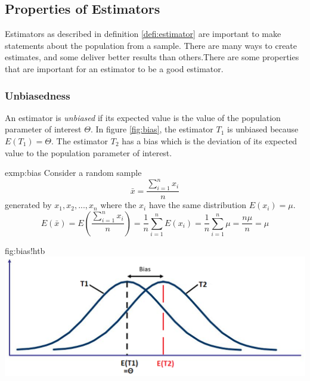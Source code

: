 \subsection{Properties of Estimators}
	Estimators as described in definition \ref{defi:estimator} are important to make statements about the population from a sample. There are many ways to create estimates, and some deliver better results than others.There are some properties that are important for an estimator to be a good estimator.
	\subsubsection{Unbiasedness}
		An estimator is \emph{unbiased} if its expected value is the value of the population parameter of interest $\Theta$. In figure \ref{fig:bias}, the estimator $T_1$ is unbiased because $E(T_1)=\Theta$. The estimator $T_2$ has a bias which is the deviation of its expected value to the population parameter of interest.
		\begin{exmp}{exmp:bias}
			Consider a random sample
			\begin{equation*}
				\bar{x}=\frac{\sum\limits_{i=1}^n x_i}{n}
			\end{equation*}
			generated by $x_1,x_2,...,x_n$ where the $x_i$ have the same distribution $E(x_i)=\mu$.
			\begin{equation*}
			E\left(\bar{x}\right)=E\left(\frac{\sum\limits_{i=1}^n x_i}{n}\right)=\frac{1}{n} \sum\limits_{i=1}^n E\left(x_i\right)=\frac{1}{n} \sum\limits_{i=1}^n \mu=\frac{n\mu}{n}=\mu
			\end{equation*}
		\end{exmp}
		\begin{fig}{fig:bias}{!htb}
			\includegraphics[width=\textwidth]{P07bias.png}
		\end{fig}
